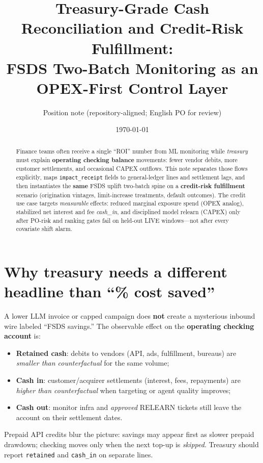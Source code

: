 \documentclass[11pt]{article}
\title{Treasury-Grade Cash Reconciliation and Credit-Risk Fulfillment:\\
FSDS Two-Batch Monitoring as an OPEX-First Control Layer}
\author{Position note (repository-aligned; English PO for review)}
\date{\today}
\begin{document}
\maketitle

\begin{abstract}
Finance teams often receive a single ``ROI'' number from ML monitoring while \emph{treasury} must explain \textbf{operating checking balance} movements: fewer vendor debits, more customer settlements, and occasional CAPEX outflows.
This note separates those flows explicitly, maps \texttt{impact\_receipt} fields to general-ledger lines and settlement lags, and then instantiates the \textbf{same} FSDS uplift two-batch spine on a \textbf{credit-risk fulfillment} scenario (origination vintages, limit-increase treatments, default outcomes).
The credit use case targets \emph{measurable} effects: reduced marginal exposure spend (OPEX analog), stabilized net interest and fee \emph{cash\_in}, and disciplined model relearn (CAPEX) only after PO-risk and ranking gates fail on held-out LIVE windows---not after every covariate shift alarm.
\end{abstract}

\section{Why treasury needs a different headline than ``\% cost saved''}
A lower LLM invoice or capped campaign does \textbf{not} create a mysterious inbound wire labeled ``FSDS savings.''
The observable effect on the \textbf{operating checking account} is:
\begin{itemize}[nosep]
  \item \textbf{Retained cash}: debits to vendors (API, ads, fulfillment, bureaus) are \emph{smaller than counterfactual} for the same volume;
  \item \textbf{Cash in}: customer/acquirer settlements (interest, fees, repayments) are \emph{higher than counterfactual} when targeting or agent quality improves;
  \item \textbf{Cash out}: monitor infra and \emph{approved} RELEARN tickets still leave the account on their settlement dates.
\end{itemize}
Prepaid API credits blur the picture: savings may appear first as slower prepaid drawdown; checking moves only when the next top-up is \emph{skipped}. Treasury should report \texttt{retained} and \texttt{cash\_in} on separate lines.
\end{document}
